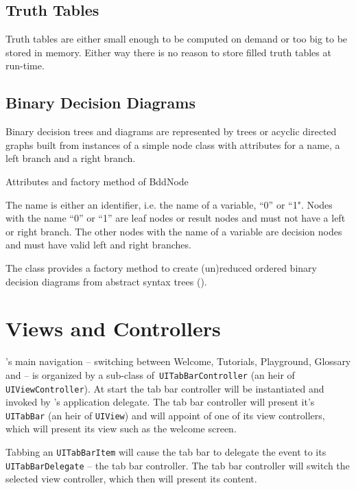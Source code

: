 \subsection{Truth Tables}

Truth tables are either small enough to be computed on demand or too big to be stored in memory.
Either way there is no reason to store filled truth tables at run-time.

\subsection{Binary Decision Diagrams}

Binary decision trees and diagrams are represented by trees 
or acyclic directed graphs built from instances of a simple node class
 with attributes for a name, a left branch and a right branch. 
\begin{table}[htdp]
\begin{center}
\caption{Attributes and factory method of BddNode}
\label{fig:BddNode}
\end{center}
\end{table}
The name is either an identifier, i.e. the name of a variable, “0” or “1". 
Nodes with the name “0” or “1” are leaf nodes or result nodes
and must not have a left or right branch.
The other nodes with the name of a variable are decision nodes 
and must have valid left and right branches. 

The class provides a factory method to create 
(un)reduced ordered binary decision diagrams from abstract syntax trees
().

\newpage
\section{Views and Controllers}

\Nyaya's main navigation – switching between Welcome, Tutorials, Playground, Glossary and \BoolTool – 
is organized by a sub-class of\verb+ UITabBarController+ (an heir of \verb+UIViewController+). 
At start the tab bar controller will be instantiated and invoked by \Nyaya's application delegate. 
The tab bar controller will present it's \verb+UITabBar+ (an heir of \verb+UIView+)
and will appoint of one of its view controllers, which will present its view such as the welcome screen.

Tabbing an \verb+UITabBarItem+ will cause the tab bar to delegate the event to its \verb+UITabBarDelegate+ – the tab bar controller.
The tab bar controller will switch the selected view controller, which then will present its content.

